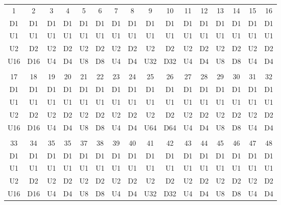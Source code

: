 \begin{table}[H]
\centering
\begin{tabular}{|c|c|c|c|c|c|c|c|c|c|c|c|c|c|c|c|}
\hline
\rowcolor[HTML]{C0C0C0} 
\multicolumn{16}{|c|}{\cellcolor[HTML]{C0C0C0}Sample}                             \\ \hline
\rowcolor[HTML]{C0C0C0} 
1   & 2   & 3  & 4  & 5  & 6  & 7  & 8  & 9   & 10  & 11 & 12 & 13 & 14 & 15 & 16 \\ \hline
D1  & D1  & D1 & D1 & D1 & D1 & D1 & D1 & D1  & D1  & D1 & D1 & D1 & D1 & D1 & D1 \\ \hline
U1  & U1  & U1 & U1 & U1 & U1 & U1 & U1 & U1  & U1  & U1 & U1 & U1 & U1 & U1 & U1 \\ \hline
U2  & D2  & U2 & D2 & U2 & D2 & U2 & D2 & U2  & D2  & U2 & D2 & U2 & D2 & U2 & D2 \\ \hline
U16 & D16 & U4 & D4 & U8 & D8 & U4 & D4 & U32 & D32 & U4 & D4 & U8 & D8 & U4 & D4 \\ \hline
\rowcolor[HTML]{C0C0C0} 
\multicolumn{16}{|c|}{\cellcolor[HTML]{C0C0C0}Sample}                             \\ \hline
\rowcolor[HTML]{C0C0C0} 
17  & 18  & 19 & 20 & 21 & 22 & 23 & 24 & 25  & 26  & 27 & 28 & 29 & 30 & 31 & 32 \\ \hline
D1  & D1  & D1 & D1 & D1 & D1 & D1 & D1 & D1  & D1  & D1 & D1 & D1 & D1 & D1 & D1 \\ \hline
U1  & U1  & U1 & U1 & U1 & U1 & U1 & U1 & U1  & U1  & U1 & U1 & U1 & U1 & U1 & U1 \\ \hline
U2  & D2  & U2 & D2 & U2 & D2 & U2 & D2 & U2  & D2  & U2 & D2 & U2 & D2 & U2 & D2 \\ \hline
U16 & D16 & U4 & D4 & U8 & D8 & U4 & D4 & U64 & D64 & U4 & D4 & U8 & D8 & U4 & D4 \\ \hline
\rowcolor[HTML]{C0C0C0} 
\multicolumn{16}{|c|}{\cellcolor[HTML]{C0C0C0}Sample}                             \\ \hline
\rowcolor[HTML]{C0C0C0} 
33  & 34  & 35 & 35 & 37 & 38 & 39 & 40 & 41  & 42  & 43 & 44 & 45 & 46 & 47 & 48 \\ \hline
D1  & D1  & D1 & D1 & D1 & D1 & D1 & D1 & D1  & D1  & D1 & D1 & D1 & D1 & D1 & D1 \\ \hline
U1  & U1  & U1 & U1 & U1 & U1 & U1 & U1 & U1  & U1  & U1 & U1 & U1 & U1 & U1 & U1 \\ \hline
U2  & D2  & U2 & D2 & U2 & D2 & U2 & D2 & U2  & D2  & U2 & D2 & U2 & D2 & U2 & D2 \\ \hline
U16 & D16 & U4 & D4 & U8 & D8 & U4 & D4 & U32 & D32 & U4 & D4 & U8 & D8 & U4 & D4 \\ \hline

\end{tabular}
\end{table}
